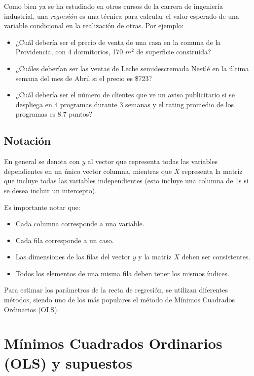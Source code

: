 \documentclass[
]{book}
\providecommand{\tightlist}{%
  \setlength{\itemsep}{0pt}\setlength{\parskip}{0pt}}
\begin{document}
Como bien ya se ha estudiado en otros cursos de la carrera de ingeniería
industrial, una \emph{regresión} es una técnica para calcular el valor
esperado de una variable condicional en la realización de otras. Por
ejemplo:

\begin{itemize}
\tightlist
\item
  ¿Cuál debería ser el precio de venta de una casa en la comuna de la
  Providencia, con 4 dormitorios, 170 \(m^2\) de superficie construida?
\item
  ¿Cuáles deberían ser las ventas de Leche semidescremada Nestlé en la
  última semana del mes de Abril si el precio es \$723?
\item
  ¿Cuál debería ser el número de clientes que ve un aviso publicitario
  si se despliega en 4 programas durante 3 semanas y el rating
  promedio de los programas es 8.7 puntos?
\end{itemize}

\subsection{Notación}\label{notaciuxf3n}

En general se denota con \(y\) al vector que representa todas las
variables dependientes en un único vector columna, mientras que \(X\)
representa la matriz que incluye todas las variables independientes
(esto incluye una columna de 1s si se desea incluir un intercepto).

Es importante notar que:

\begin{itemize}
\tightlist
\item
  Cada columna corresponde a una variable.
\item
  Cada fila corresponde a un caso.
\item
  Las dimensiones de las filas del vector \(y\) y la matriz \(X\) deben
  ser consistentes.
\item
  Todos los elementos de una misma fila deben tener los mismos
  índices.
\end{itemize}

Para estimar los parámetros de la recta de regresión, se utilizan
diferentes métodos, siendo uno de los más populares el método de Mínimos
Cuadrados Ordinarios (OLS).

\section{Mínimos Cuadrados Ordinarios (OLS) y supuestos}\label{muxednimos-cuadrados-ordinarios-ols-y-supuestos}
\end{document}
